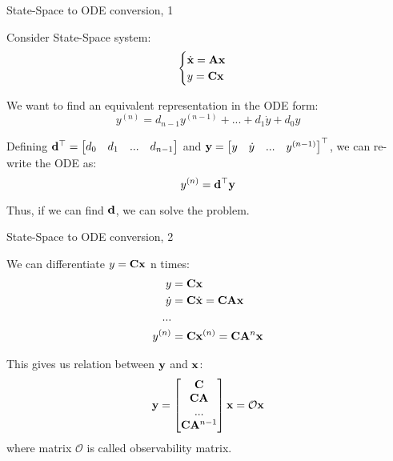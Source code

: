 \documentclass{beamer}
\begin{document}
{
\begin{frame}{State-Space to ODE conversion, 1}
	\begin{flushleft}
		
		Consider State-Space system:
		\begin{equation}
			\begin{cases}
				\dot{\mathbf{x}} = \mathbf{A} \mathbf{x} \\
				y = \mathbf{C}\mathbf{x}
			\end{cases}
		\end{equation}
	
		We want to find an equivalent representation in the ODE form:
		\begin{equation}
			y^{(n)} = d_{n-1} y^{(n-1)} + ... + d_1 \dot y + d_0 y
		\end{equation}
		
		Defining $\mathbf{d}^\top = \begin{bmatrix}
			d_0 & d_1 & ... & d_{n-1}   
		\end{bmatrix}$ and 
	$\mathbf{y} = \begin{bmatrix}
		 y & \dot y & ... & y^{(n-1)} 
	\end{bmatrix}^\top$, we can re-write the ODE as:
		\begin{equation}
		y^{(n)} = \mathbf{d}^\top \mathbf{y}
		\end{equation}

		Thus, if we can find $\mathbf{d}$, we can solve the problem.
		
		
	\end{flushleft}
\end{frame}
}



{
\begin{frame}{State-Space to ODE conversion, 2}
	\begin{flushleft}
		
		We can differentiate $y = \mathbf{C}\mathbf{x}$ n times:
		\begin{align}
			y &= \mathbf{C}\mathbf{x} \\
			\dot y &= \mathbf{C}\dot{\mathbf{x}} = \mathbf{C}\mathbf{A}\mathbf{x} \\
			... \\
			y^{(n)} &= \mathbf{C}\mathbf{x}^{(n)} = \mathbf{C}\mathbf{A}^n\mathbf{x}
		\end{align}
		
		This gives us relation between $\mathbf{y}$ and $\mathbf{x}$:
		\begin{align}
			\mathbf{y} = 
			\begin{bmatrix}
				\mathbf{C} \\
				\mathbf{C} \mathbf{A} \\
				... \\
				\mathbf{C}\mathbf{A}^{n-1}
			\end{bmatrix}
		\mathbf{x} = \mathcal{O}\mathbf{x}
		\end{align}
		where matrix $\mathcal{O}$ is called observability matrix.
		
		
	\end{flushleft}
\end{frame}
}
\end{document}
